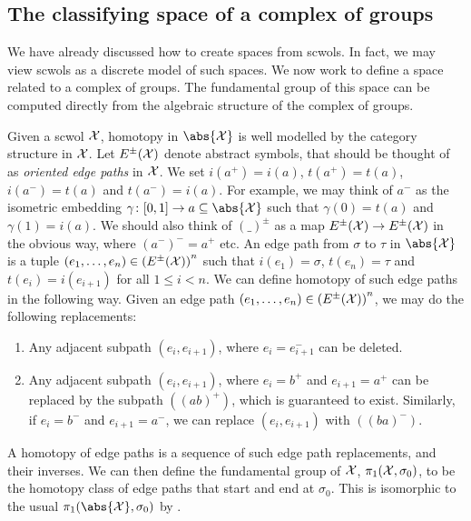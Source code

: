 \subsection{The classifying space of a complex of groups}
We have already discussed how to create spaces from scwols.
In fact, we may view scwols as a discrete model of such spaces.
We now work to define a space related to a complex of groups.
The fundamental group of this space can be computed directly from the algebraic structure of the complex of groups.

Given a scwol $\mathcal{X}$, homotopy in $\abs{\calx}$ is well modelled by the category structure in $\mathcal{X}$.
Let  $E^{\pm}(\mathcal{X})$ denote abstract symbols, that should be thought of as \emph{oriented edge paths} in $\mathcal{X}$.
We set $i(a^+) = i(a)$, $t(a^+) = t(a)$, $i(a^-) = t(a)$ and $t(a^-)= i(a)$.
For example, we may think of $a^-$ as the isometric embedding $\gamma \colon [0,1] \to a \subseteq \abs{\calx}$ such that  $\gamma(0) = t(a)$ and $\gamma(1) = i(a)$.
We should also think of $(\_)^\pm$ as a map $E^\pm(\mathcal{X}) \to E^\pm(\mathcal{X})$ in the obvious way, where  $(a^-)^-= a^+$ etc.
An edge path from $\sigma$ to  $\tau$ in $\abs{\calx}$ is a tuple $(e_1, \ldots, e_n) \in \left(E^\pm(\mathcal{X})\right)^n$ such that $i(e_1)=\sigma$,  $t(e_n)=\tau$ and  $t(e_i) = i(e_{i+1})$ for all  $1 \leq i < n$.
We can define homotopy of such edge paths in the following way.
Given an edge path $(e_1, \ldots, e_n) \in \left(E^\pm(\mathcal{X})\right)^n$, we may do the following replacements:
\begin{enumerate}
	\item Any adjacent subpath $(e_i,e_{i+1})$, where $e_i=e_{i+1}^-$ can be deleted.
	\item Any adjacent subpath $(e_i,e_{i+1})$, where $e_i = b^+$ and  $e_{i+1}=a^+$ can be replaced by the subpath $((ab)^+)$, which is guaranteed to exist.
	      Similarly, if $e_i = b^-$ and  $e_{i+1}=a^-$, we can replace $(e_i,e_{i+1})$ with  $((ba)^-)$.
\end{enumerate}
A homotopy of edge paths is a sequence of such edge path replacements, and their inverses.
We can then define the fundamental group of $\mathcal{X}$,  $\pi_1(\mathcal{X},\sigma_0)$, to be the homotopy class of edge paths that start and end at  $\sigma_0$.
This is isomorphic to the usual $\pi_1(\abs{\calx}, \sigma_0)$ by \cite[Corollary 4.12]{hatcher_algebraic_2001}.


